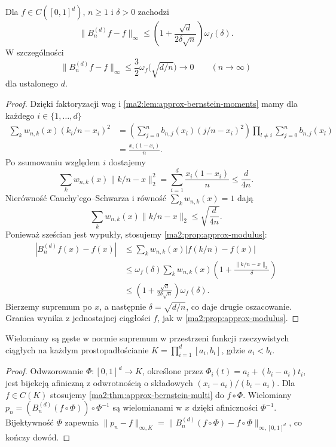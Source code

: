 \begin{twierdzenie}
\label{ma2:thm:approx-bernstein-multi}
Dla $f\in C([0,1]^d)$, $n\ge1$ i $\delta>0$
zachodzi
\[
 \|B_n^{(d)}f-f\|_\infty\le
 \left(1+\frac{\sqrt d}{2\delta\sqrt n}\right)
 \omega_f(\delta).
\]
W szczególności
\[
 \|B_n^{(d)}f-f\|_\infty
 \le\frac32\omega_f\bigl(\sqrt{d/n}\bigr)
 \longrightarrow0
 \qquad(n\to\infty)
\]
dla ustalonego $d$.
\end{twierdzenie}
\begin{proof}
Dzięki faktoryzacji wag i
\ref{ma2:lem:approx-bernstein-moments}
mamy dla każdego $i\in\{1,\ldots,d\}$
\[
 \begin{aligned}
 \sum_k w_{n,k}(x)(k_i/n-x_i)^2
 &=
 \left(\sum_{j=0}^n b_{n,j}(x_i)(j/n-x_i)^2\right)
 \prod_{l\ne i}\sum_{j=0}^n b_{n,j}(x_l)\\
 &=\frac{x_i(1-x_i)}n.
 \end{aligned}
\]
Po zsumowaniu względem $i$ dostajemy
\[
 \sum_k w_{n,k}(x)\|k/n-x\|_2^2
 =\sum_{i=1}^d\frac{x_i(1-x_i)}n
 \le\frac d{4n}.
\]
Nierówność Cauchy'ego--Schwarza i równość
$\sum_k w_{n,k}(x)=1$ dają
\[
 \sum_k w_{n,k}(x)\|k/n-x\|_2
 \le\sqrt{\frac d{4n}}.
\]
Ponieważ sześcian jest wypukły, stosujemy
\ref{ma2:prop:approx-modulus}:
\[
 \begin{aligned}
 |B_n^{(d)}f(x)-f(x)|
 &\le\sum_k w_{n,k}(x)|f(k/n)-f(x)|\\
 &\le\omega_f(\delta)
 \sum_k w_{n,k}(x)
 \left(1+\frac{\|k/n-x\|_2}{\delta}\right)\\
 &\le\left(1+\frac{\sqrt d}{2\delta\sqrt n}\right)
 \omega_f(\delta).
 \end{aligned}
\]
Bierzemy supremum po $x$, a następnie
$\delta=\sqrt{d/n}$, co daje drugie oszacowanie.
Granica wynika z jednostajnej ciągłości $f$,
jak w \ref{ma2:prop:approx-modulus}.
\end{proof}

\begin{wniosek}
\label{ma2:cor:approx-bernstein-box}
Wielomiany są gęste w normie supremum
w przestrzeni funkcji rzeczywistych ciągłych
na każdym prostopadłościanie
$K=\prod_{i=1}^d[a_i,b_i]$, gdzie $a_i<b_i$.
\end{wniosek}
\begin{proof}
Odwzorowanie
$\Phi:[0,1]^d\to K$, określone przez
$\Phi_i(t)=a_i+(b_i-a_i)t_i$, jest bijekcją
afiniczną z odwrotnością o składowych
$(x_i-a_i)/(b_i-a_i)$.
Dla $f\in C(K)$ stosujemy
\ref{ma2:thm:approx-bernstein-multi} do $f\circ\Phi$.
Wielomiany
$p_n=(B_n^{(d)}(f\circ\Phi))\circ\Phi^{-1}$
są wielomianami w $x$ dzięki afiniczności
$\Phi^{-1}$. Bijektywność $\Phi$ zapewnia
$\|p_n-f\|_{\infty,K}
=\|B_n^{(d)}(f\circ\Phi)-f\circ\Phi\|_{\infty,[0,1]^d}$,
co kończy dowód.
\end{proof}

